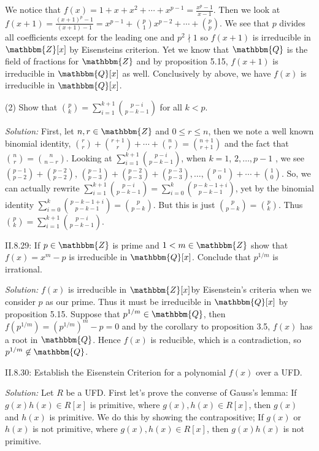 \documentclass{letter}
\newcommand{\nin}{\not\in}
\newcommand{\tmem}[1]{{\em #1\/}}
\begin{document}
We notice that $f (x) = 1 + x + x^2 + \cdots + x^{p - 1} = \frac{x^p - 1}{x -
1}$. Then we look at $f (x + 1) = \frac{(x + 1)^p - 1}{(x + 1) - 1} = x^{p -
1} + \binom{p}{1} x^{p - 2} + \cdots + \binom{p}{p}$. We see that $p$ divides
all coefficients except for the leading one and $p^2 \nmid 1$ so $f (x + 1)$
is irreducible in $\mathbbm{Z}[x]$ by Eisensteins criterion. Yet we know that
$\mathbbm{Q}$ is the field of fractions for $\mathbbm{Z}$ and by proposition
5.15, $f (x + 1)$ is irreducible in $\mathbbm{Q}[x]$ as well. Conclusively by
above, we have $f (x)$ is irreducible in $\mathbbm{Q}[x]$.

(2) Show that $\binom{p}{k} = \sum^{k + 1}_{i = 1} \binom{p - i}{p - k - 1}$
for all $k < p$.

{\tmem{Solution:}} First, let $n, r \in \mathbbm{Z}$ and $0 \leq r \leq n$,
then we note a well known binomial identity, $\binom{r}{r} + \binom{r + 1}{r}
+ \cdots + \binom{n}{r} = \binom{n + 1}{r + 1}$ and the fact that
$\binom{n}{r} = \binom{n}{n - r}$. Looking at $\sum^{k + 1}_{i = 1} \binom{p -
i}{p - k - 1}$, when $k = 1$, $2, \ldots, p - 1$ , we see $\binom{p - 1}{p -
2} + \binom{p - 2}{p - 2}$, $\binom{p - 1}{p - 3} + \binom{p - 2}{p - 3} +
\binom{p - 3}{p - 3}, \ldots, \binom{p - 1}{0} + \cdots + \binom{1}{0}$. So,
we can actually rewrite $\sum^{k + 1}_{i = 1} \binom{p - i}{p - k - 1} =
\sum^k_{i = 0} \binom{p - k - 1 + i}{p - k - 1}$, yet by the binomial identity
$\sum^k_{i = 0} \binom{p - k - 1 + i}{p - k - 1} = \binom{p}{p - k}$. But this
is just $\binom{p}{p - k} = \binom{p}{k}$. Thus $\binom{p}{k} = \sum^{k +
1}_{i = 1} \binom{p - i}{p - k - 1}$.

II.8.29: If $p \in \mathbbm{Z}$ is prime and $1 < m \in \mathbbm{Z}$ show that
$f (x) = x^m - p$ is irreducible in $\mathbbm{Q}[x]$. Conclude that $p^{1 /
m}$ is irrational.

{\tmem{Solution:}} $f (x)$ is irreducible in $\mathbbm{Z}[x]$by Eisenstein's
criteria when we consider $p$ as our prime. Thus it must be irreducible in
$\mathbbm{Q}[x]$ by proposition 5.15. Suppose that $p^{1 / m} \in
\mathbbm{Q}$, then $f (p^{1 / m}) = (p^{1 / m})^m - p = 0$ and by the
corollary to proposition 3.5, $f (x)$ has a root in $\mathbbm{Q}$. Hence $f
(x)$ is reducible, which is a contradiction, so $p^{1 / m} \nin \mathbbm{Q}$.

II.8.30: Establish the Eisenstein Criterion for a polynomial $f (x)$ over a
UFD.

{\tmem{Solution:}} Let $R$ be a UFD. First let's prove the converse of Gauss's
lemma: If $g (x) h (x) \in R [x]$ is primitive, where $g (x), h (x) \in R
[x]$, then $g (x)$ and $h (x)$ is primitive. We do this by showing the
contrapositive; If $g (x)$ or $h (x)$ is not primitive, where $g (x), h (x)
\in R [x]$, then $g (x) h (x)$ is not primitive.
\end{document}
